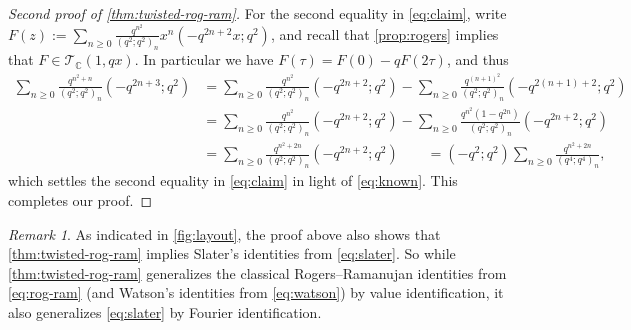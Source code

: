\documentclass[reqno,11pt]{amsart}
\theoremstyle{definition}
\theoremstyle{remark}
\newtheorem*{remark}{Remark}
\numberwithin{equation}{section}
\newcommand{\C}{\mathbb{C}}
\newcommand{\mT}{\mathcal{T}}
\begin{document}
\begin{proof}[Second proof of \cref{thm:twisted-rog-ram}]
For the second equality in \cref{eq:claim}, write $F(z) := \sum_{n \ge 0} \frac{q^{n^2}}{\left(q^2; q^2\right)_n}x^n \left(-q^{2n+2}x; q^2\right)$, and recall that \cref{prop:rogers} implies that $F \in \mT_\C(1, qx)$. In particular we have $F(\tau) = F(0) - q F(2\tau)$, and thus
\[
\begin{aligned}
    \sum_{n \ge 0} \frac{q^{n^2+n}}{\left(q^2; q^2\right)_n} \left(-q^{2n+3}; q^2\right)
    &=
    \sum_{n \ge 0} \frac{q^{n^2}}{\left(q^2; q^2\right)_n} \left(-q^{2n+2}; q^2\right)
    -
    \sum_{n \ge 0} \frac{q^{(n+1)^2}}{\left(q^2; q^2\right)_n} \left(-q^{2(n+1)+2}; q^2\right)
    \\
    &=
    \sum_{n \ge 0} \frac{q^{n^2}}{\left(q^2; q^2\right)_n} \left(-q^{2n+2}; q^2\right)
    -
    \sum_{n \ge 0} \frac{q^{n^2}\left(1-q^{2n}\right)}{\left(q^2; q^2\right)_n} \left(-q^{2n+2}; q^2\right)
    \\
    &= 
    \sum_{n \ge 0}
    \frac{q^{n^2+2n}}{\left(q^2; q^2\right)_n} \left(-q^{2n+2}; q^2\right)
    \qquad
    =
    \left(-q^2; q^2\right) \sum_{n \ge 0}
    \frac{q^{n^2+2n}}{\left(q^4; q^4\right)_n}
    ,
\end{aligned}
\]
which settles the second equality in \cref{eq:claim} in light of \cref{eq:known}. This completes our proof.
\end{proof}
\begin{remark}
As indicated in \cref{fig:layout}, the proof above also shows that \cref{thm:twisted-rog-ram} implies Slater's identities from \cref{eq:slater}. So while \cref{thm:twisted-rog-ram} generalizes the classical Rogers--Ramanujan identities from \cref{eq:rog-ram} (and Watson's identities from \cref{eq:watson}) by value identification, it also generalizes \cref{eq:slater} by Fourier identification.
\end{remark}
\end{document}

